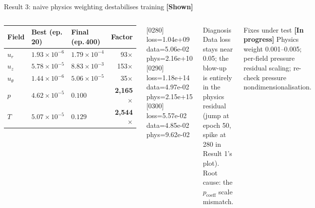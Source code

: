 \documentclass[aspectratio=169,10pt]{beamer}
\newcommand{\shown}{\textcolor{okgreen}{\textbf{[Shown]}}}
\newcommand{\pending}{\textcolor{warnorange}{\textbf{[In progress]}}}
\begin{document}
\begin{frame}{Result 3: naive physics weighting destabilises training \shown}
\begin{columns}[T,onlytextwidth]
\begin{center}
\footnotesize
\begin{tabular}{lllr}
\toprule
Field & Best (ep.\,20) & Final (ep.\,400) & Factor \\
\midrule
$u_r$ & $1.93\times10^{-6}$ & $1.79\times10^{-4}$ & 93$\times$ \\
$u_z$ & $5.78\times10^{-5}$ & $8.83\times10^{-3}$ & 153$\times$ \\
$u_\theta$ & $1.44\times10^{-6}$ & $5.06\times10^{-5}$ & 35$\times$ \\
$p$ & $4.62\times10^{-5}$ & $0.100$ & \textbf{2,165$\times$} \\
$T$ & $5.07\times10^{-5}$ & $0.129$ & \textbf{2,544$\times$} \\
\bottomrule
\end{tabular}
\end{center}
{\scriptsize\ttfamily
{[0280]} loss=1.04e+09 data=5.06e-02 phys=2.16e+10\\
{[0290]} loss=1.18e+14 data=4.97e-02 phys=2.15e+15\\
{[0300]} loss=5.57e-02 data=4.85e-02 phys=9.62e-02}
\begin{alertblock}{Diagnosis}
\small Data loss stays near 0.05; the blow-up is entirely in the physics residual (jump at epoch 50, spike at 280 in Result 1's plot). Root cause: the $p_{\mathrm{coeff}}$ scale mismatch.
\end{alertblock}
\begin{exampleblock}{Fixes under test \pending}
\small Physics weight 0.001--0.005; per-field pressure residual scaling; re-check pressure nondimensionalisation.
\end{exampleblock}
\end{columns}
\end{frame}
\end{document}

